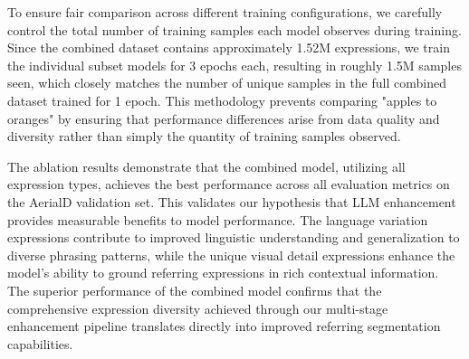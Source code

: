 \begin{table}[H]
\centering
\caption{Ablation Study: Cross-Dataset Performance by Training Configuration}
\label{tab:ablation_expression_types}
\end{table}

To ensure fair comparison across different training configurations, we carefully control the total number of training samples each model observes during training. Since the combined dataset contains approximately 1.52M expressions, we train the individual subset models for 3 epochs each, resulting in roughly 1.5M samples seen, which closely matches the number of unique samples in the full combined dataset trained for 1 epoch. This methodology prevents comparing "apples to oranges" by ensuring that performance differences arise from data quality and diversity rather than simply the quantity of training samples observed.

The ablation results demonstrate that the combined model, utilizing all expression types, achieves the best performance across all evaluation metrics on the AerialD validation set. This validates our hypothesis that LLM enhancement provides measurable benefits to model performance. The language variation expressions contribute to improved linguistic understanding and generalization to diverse phrasing patterns, while the unique visual detail expressions enhance the model's ability to ground referring expressions in rich contextual information. The superior performance of the combined model confirms that the comprehensive expression diversity achieved through our multi-stage enhancement pipeline translates directly into improved referring segmentation capabilities.
